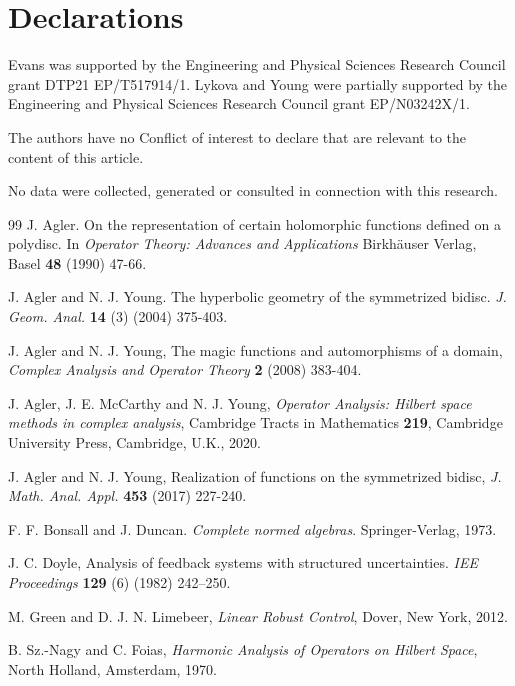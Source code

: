 \documentclass[12pt,reqno]{amsart}
\numberwithin{equation}{section}
\theoremstyle{definition}
\begin{document}
\section{Declarations}

Evans was supported by the Engineering and Physical Sciences Research Council grant DTP21  EP/T517914/1.
Lykova and Young were partially supported by the Engineering and Physical Sciences Research Council grant EP/N03242X/1.

 The authors have no Conﬂict of interest to declare that are
relevant to the content of this article.

 No data were collected, generated or consulted in connection with this research.\\
 




\begin{thebibliography}{99}
 J. Agler. On the representation of certain holomorphic functions defined on a polydisc. In {\it Operator Theory: Advances and Applications}
Birkhäuser Verlag, Basel {\bf 48}  (1990) 47-66. 


 J. Agler and N. J. Young. The hyperbolic geometry of the symmetrized bidisc. {\it J. Geom. Anal.}  {\bf 14} (3) (2004) 375-403.

 J. Agler and N. J. Young,  The magic functions and automorphisms of a domain, {\em Complex Analysis and Operator Theory} {\bf 2} (2008) 383-404.

 J. Agler, J. E. McCarthy and N. J. Young, {\em Operator Analysis: Hilbert space methods in complex analysis}, Cambridge Tracts in Mathematics {\bf 219}, Cambridge University Press, Cambridge, U.K., 2020.


 J. Agler and N. J. Young, Realization of functions on the symmetrized bidisc, {\em J. Math. Anal. Appl.} {\bf 453} (2017) 227-240.

 F. F. Bonsall and J. Duncan. {\it Complete normed algebras}. Springer-Verlag, 1973.

 J. C. Doyle, Analysis of feedback systems
with structured  uncertainties. {\em  IEE Proceedings} {\bf 129} (6) (1982)  242--250.


 M. Green and D. J. N. Limebeer, {\em Linear Robust Control}, Dover, New York, 2012.
 	
 B. Sz.-Nagy and C. Foias, {\em Harmonic Analysis of Operators on Hilbert Space}, North Holland, Amsterdam, 1970.



\end{thebibliography}
\end{document}
